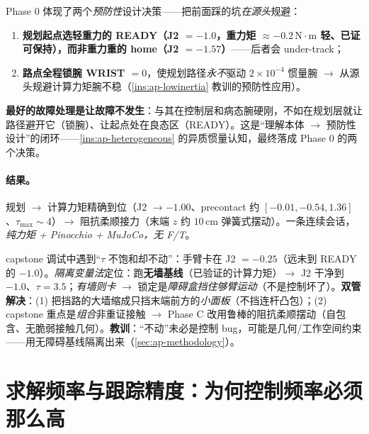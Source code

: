 \begin{insight}\label{ins:ap-preventive}
Phase 0 体现了两个\emph{预防性}设计决策——把前面踩的坑\emph{在源头}规避：
\begin{enumerate}
  \item \textbf{规划起点选轻重力的 READY（J2 $=-1.0$，重力矩 $\approx-0.2\,\mathrm{N\!\cdot\! m}$ 轻、已证可保持），而非重力重的 home（J2 $=-1.57$）}——后者会 under-track；
  \item \textbf{路点全程锁腕 WRIST $=0$}，使规划路径\emph{永不}驱动 $2\times10^{-4}$ 惯量腕 $\to$ 从源头规避计算力矩腕不稳（\cref{ins:ap-lowinertia} 教训的预防性应用）。
\end{enumerate}
\textbf{最好的故障处理是让故障不发生}：与其在控制层和病态腕硬刚，不如在规划层就让路径避开它（锁腕）、让起点处在良态区（READY）。这是“理解本体 $\to$ 预防性设计”的闭环——\cref{ins:ap-heterogeneous} 的异质惯量认知，最终落成 Phase 0 的两个决策。
\end{insight}

\paragraph{结果。}
规划 $\to$ 计算力矩精确到位（J2 $\to-1.00$、precontact 约 $[-0.01,-0.54,1.36]$、$\tau_{\max}\sim4$）$\to$ 阻抗柔顺接力（末端 $z$ 约 $10\,\mathrm{cm}$ 弹簧式摆动）。一条连续会话，\emph{纯力矩 + Pinocchio + MuJoCo，无 F/T}。

\begin{pitfall}\label{pit:ap-wall-block}
capstone 调试中遇到“$\tau$ 不饱和却不动”：手臂卡在 J2 $=-0.25$（远未到 READY 的 $-1.0$）。\emph{隔离变量法}定位：跑\textbf{无墙基线}（已验证的计算力矩）$\to$ J2 干净到 $-1.0$、$\tau=3.5$；\emph{有墙则卡} $\to$ 锁定是\emph{障碍盒挡住够臂运动}（不是控制坏了）。\textbf{双管解决}：(1) 把挡路的大墙缩成只挡末端前方的\emph{小面板}（不挡连杆凸包）；(2) capstone 重点是\emph{组合}非重证接触 $\to$ Phase C 改用鲁棒的阻抗柔顺摆动（自包含、无脆弱接触几何）。\textbf{教训}：“不动”未必是控制 bug，可能是几何/工作空间约束——用无障碍基线隔离出来（\cref{sec:ap-methodology}）。
\end{pitfall}

\section{求解频率与跟踪精度：为何控制频率必须那么高}
\label{sec:ap-tracking-accuracy}

